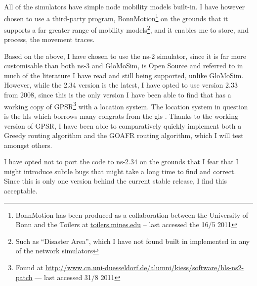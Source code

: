 All of the simulators have simple node mobility models built-in. I have however chosen to use a third-party program, BonnMotion\footnote{BonnMotion has been produced as a collaboration between the University of Bonn and the Toilers at \url{toilers.mines.edu} -- last accessed the 16/5 2011} on the grounds that it supports a far greater range of mobility models\footnote{Such as ``Disaster Area'', which I have not found built in implemented in any of the network simulators}, and it enables me to store, and process, the movement traces.

Based on the above, I have chosen to use the ns-2 simulator, since it is far more customisable than both ns-3 and GloMoSim, is Open Source and referred to in much of the literature I have read  and still being supported, unlike GloMoSim. However, while the 2.34 version is the latest, I have opted to use version 2.33 from 2008, since this is the only version I have been able to find that has a working copy of GPSR\footnote{Found at \url{http://www.cn.uni-duesseldorf.de/alumni/kiess/software/hls-ns2-patch} --- last accessed 31/8 2011} with a location system. The location system in question is the \ac{hls} which borrows many congrats from the \ac{gls} \cite{hls}. Thanks to the working version of GPSR, I have been able to comparatively quickly implement both a Greedy routing algorithm and the GOAFR routing algorithm, which I will test amongst others. 

I have opted not to port the code to ns-2.34 on the grounds that I fear that I might introduce subtle bugs that might take a long time to find and correct. Since this is only one version behind the current stable release, I find this acceptable.
